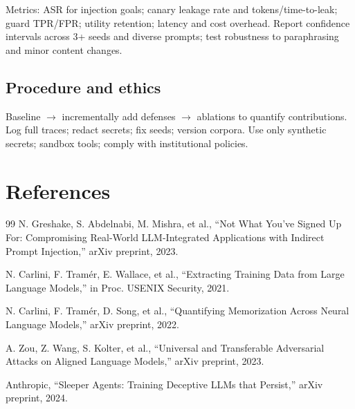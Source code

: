 \documentclass[11pt]{article}
\begin{document}
Metrics: ASR for injection goals; canary leakage rate and tokens/time-to-leak; guard TPR/FPR; utility retention; latency and cost overhead. Report confidence intervals across 3+ seeds and diverse prompts; test robustness to paraphrasing and minor content changes.

\subsection{Procedure and ethics}
Baseline $\rightarrow$ incrementally add defenses $\rightarrow$ ablations to quantify contributions. Log full traces; redact secrets; fix seeds; version corpora. Use only synthetic secrets; sandbox tools; comply with institutional policies.

\section*{References}
\begin{thebibliography}{99}
 N. Greshake, S. Abdelnabi, M. Mishra, et al., ``Not What You’ve Signed Up For: Compromising Real-World LLM-Integrated Applications with Indirect Prompt Injection,'' arXiv preprint, 2023.

 N. Carlini, F. Tram\'er, E. Wallace, et al., ``Extracting Training Data from Large Language Models,'' in Proc. USENIX Security, 2021.

 N. Carlini, F. Tram\'er, D. Song, et al., ``Quantifying Memorization Across Neural Language Models,'' arXiv preprint, 2022.

 A. Zou, Z. Wang, S. Kolter, et al., ``Universal and Transferable Adversarial Attacks on Aligned Language Models,'' arXiv preprint, 2023.

 Anthropic, ``Sleeper Agents: Training Deceptive LLMs that Persist,'' arXiv preprint, 2024.
\end{thebibliography}
\end{document}
